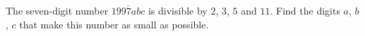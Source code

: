 The seven-digit number $\overline{1997abc}$ is divisible by $2$, $3$, $5$ and $11$. Find the digits $a$, $b$, $c$ that make this number as small as possible.
